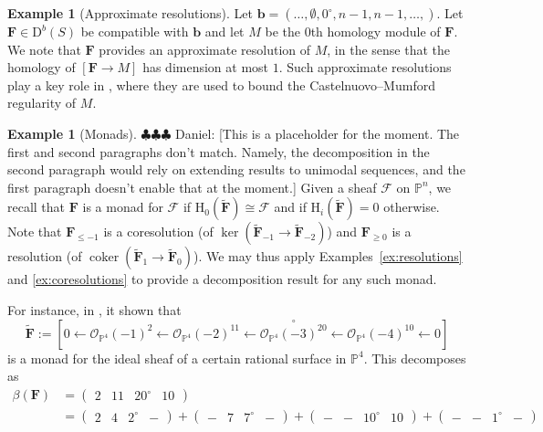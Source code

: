 \documentclass[12pt]{amsart}
\theoremstyle{definition}
\newtheorem{example}[lemma]{Example}
\theoremstyle{remark}
\newcommand{\coker}{\operatorname{coker}}
\newcommand{\PP}{\mathbb{P}}
\newcommand{\HH}{\mathrm{H}}
\newcommand{\bb}{\mathbf{b}}
\newcommand{\cO}{\mathcal{O}}
\newcommand{\cF}{\mathcal{F}}
\newcommand{\FF}{\mathbf{F}}
\newcommand{\zp}{\circ}
\newcommand{\DD}{\mathrm{D}}
\newcommand{\daniel}[1]{{\color{green} \sf $\clubsuit\clubsuit\clubsuit$ Daniel: [#1]}}
\begin{document}
\begin{example}[Approximate resolutions]
Let $\bb=(\dots,\emptyset,0^\zp,n-1,n-1,\dots,)$.   Let $\FF\in \DD^b(S)$ be compatible with $\bb$ and let $M$ be the $0$th homology module of $\FF$.  We note that $\FF$ provides an approximate resolution of $M$, in the sense that the homology of $[\FF\to M]$ has dimension at most $1$.  Such approximate resolutions play a key role in \cite[Lemma~1.6]{gruson-lazarsfeld-peskine}, where they are used to bound the Castelnuovo--Mumford regularity of $M$.
\end{example}

\begin{example}[Monads]\daniel{This is a placeholder for the moment.  The first and second paragraphs don't match.  Namely, the decomposition in the second paragraph would rely on extending results to unimodal sequences, and the first paragraph doesn't enable that at the moment.}
Given a sheaf $\cF$ on $\PP^n$, we recall that $\FF$ is a monad for $\cF$ if $\HH_0(\widetilde{\FF})\cong \cF$ and if $\HH_i(\widetilde{\FF})=0$ otherwise.  Note that $\FF_{\leq -1}$ is a coresolution (of $\ker\left(\widetilde{\FF}_{-1}\to \widetilde{\FF}_{-2}\right)$) and $\FF_{\geq 0}$ is a resolution (of $\coker\left(\widetilde{\FF}_{1}\to \widetilde{\FF}_{0}\right)$).  We may thus apply Examples~\ref{ex:resolutions} and \ref{ex:coresolutions} to provide a decomposition result for any such monad.

For instance, in \cite[Example 8.2]{eis-floy-schrey}, it shown that
\[
\widetilde{\FF}:=\left[0\gets \cO_{\PP^4}(-1)^2 \gets  \cO_{\PP^4}(-2)^{11}\gets \overset{\zp}{\cO_{\PP^4}(-3)^{20}}\gets \cO_{\PP^4}(-4)^{10}\gets 0 \right]
\]
is a monad for the ideal sheaf of a certain rational surface in $\PP^4$.  This decomposes as
\begin{align*}
\beta(\FF)&=
\begin{pmatrix}
2&11&20^\zp&10
\end{pmatrix}
\\
&=
\begin{pmatrix}
2&4&2^\zp&-
\end{pmatrix}
+
\begin{pmatrix}
-&7&7^\zp&-
\end{pmatrix}
+
\begin{pmatrix}
-&-&10^\zp&10
\end{pmatrix}
+
\begin{pmatrix}
-&-&1^\zp&-
\end{pmatrix}
\end{align*}
\end{example}
\end{document}
